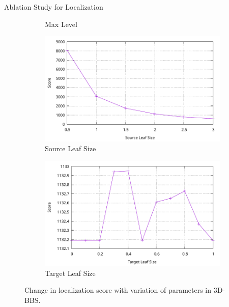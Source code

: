 \begin{frame}{Ablation Study for Localization}
\begin{figure}
\begin{subfigure}[t]{0.32\textwidth}
        \caption{Max Level}
    \end{subfigure}
    \begin{subfigure}[t]{0.32\textwidth}
        \centering
        \includegraphics[width=\textwidth]{../02-global-localization/plots/src_leaf_size.pdf}
        \caption{Source Leaf Size}
    \end{subfigure}
    \begin{subfigure}[t]{0.32\textwidth}
        \centering
        \includegraphics[width=\textwidth]{../02-global-localization/plots/tar_leaf_size.pdf}
        \caption{Target Leaf Size}
    \end{subfigure}
    \caption{Change in localization score with variation of parameters in 3D-BBS.}
\end{figure}
\end{frame}

